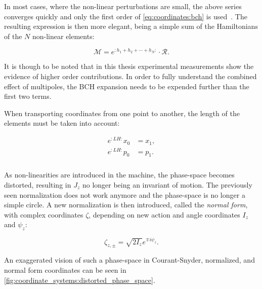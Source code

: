 In most cases, where the non-linear perturbations are small, the above series converges quickly
and only the first order of \cref{eq:coordinates:bch} is
used~\cite{carlier_nonlinear_2020-1}. The resulting expression is then more elegant, being a simple
sum of the Hamiltonians of the $N$ non-linear elements:

\begin{equation}
   \mathcal{M} = e^{:h_1 + h_2 + \cdots + h_N:} \cdot \mathcal{R}.
\end{equation}

It is though to be noted that in this thesis experimental measurements show the evidence of higher
order contributions. In order to fully understand the combined effect of multipoles, the BCH
expansion needs to be expended further than the first two terms.

When transporting coordinates from one point to another, the length of the elements must be taken
into account:

\begin{equation}
    \begin{aligned}
        e^{:LH:} x_0 &= x_1,\\
        e^{:LH:} p_0 &= p_1.
    \end{aligned}
\end{equation}


\subsubsection{}

As non-linearities are introduced in the machine, the phase-space becomes distorted, resulting in
$J_z$ no longer being an invariant of motion. The previously seen normalization does not work
anymore and the phase-space is no longer a simple circle. A new normalization is then introduced,
called the \textit{normal form}, with complex coordinates $\zeta$, depending on new action and
angle coordinates $I_z$ and $\psi_z$:

\begin{equation}
    \zeta_{z,\pm} = \sqrt{2I_z} e^{\mp i \psi_z}.
    \label{eq:coordinate_systems:normal_form_coordinates}
\end{equation}

An exaggerated vision of such a phase-space in Courant-Snyder, normalized, and normal form
coordinates can be seen in \cref{fig:coordinate_systems:distorted_phase_space}.

